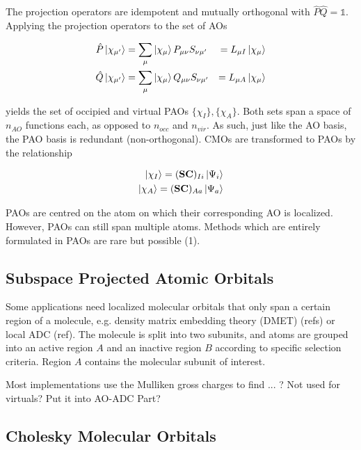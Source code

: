 The projection operators are idempotent and mutually orthogonal with $\hat{P}\hat{Q} = \mathbb{1}$. Applying the projection operators to the set of AOs 

\begin{eqnarray}
\hat{P} \ket{\chi_{\mu'}} &= \sum_{\mu} \ket{\chi_{\mu}} P_{\mu\nu} S_{\nu\mu'} &= L_{\mu I} \ket{\chi_{\mu}} \\
\hat{Q} \ket{\chi_{\mu'}} &= \sum_{\mu} \ket{\chi_{\mu}} Q_{\mu\nu} S_{\nu\mu'} &= L_{\mu A} \ket{\chi_{\mu}}
\end{eqnarray} 

\noindent yields the set of occipied and virtual PAOs $\{\chi_I\},\{\chi_A\}$. Both sets span a space of $n_{AO}$ functions each, as opposed to $n_{occ}$ and $n_{vir}$. As such, just like the AO basis, the PAO basis is redundant (non-orthogonal). CMOs are transformed to PAOs by the relationship

\begin{eqnarray}
\ket{\chi_I} = (\mathbf{SC})_{Ii} \ket{\Psi_i} \\
\ket{\chi_A} = (\mathbf{SC})_{Aa} \ket{\Psi_a}
\end{eqnarray}

PAOs are centred on the atom on which their corresponding AO is localized. However, PAOs can still span multiple atoms. Methods which are entirely formulated in PAOs are rare but possible (1). 

\subsection{Subspace Projected Atomic Orbitals}

Some applications need localized molecular orbitals that only span a certain region of a molecule, e.g. density matrix embedding theory (DMET) (refs) or local ADC (ref). The molecule is split into two subunits, and atoms are grouped into an active region $A$ and an inactive region $B$ according to specific selection criteria. Region $A$ contains the molecular subunit of interest. 

Most implementations use the Mulliken gross charges to find
... ? Not used for virtuals? Put it into AO-ADC Part?


\subsection{Cholesky Molecular Orbitals}

